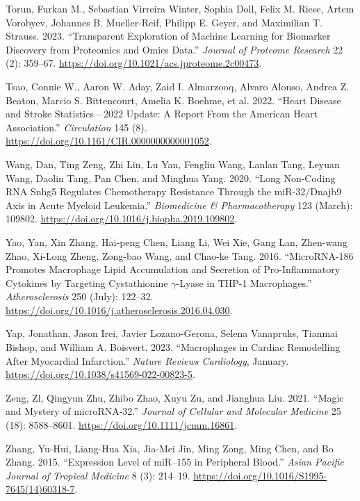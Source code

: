 \documentclass[smallextended]{svjour3}       %
\newlength{\cslhangindent}
\newlength{\cslentryspacingunit} %
\newenvironment{CSLReferences}[2] %
 {%
  \setlength{\parindent}{0pt}
  \ifodd #1
  \let\oldpar\par
  \def\par{\hangindent=\cslhangindent\oldpar}
  \fi
  \setlength{\parskip}{#2\cslentryspacingunit}
 }%
 {}
\begin{document}
\begin{CSLReferences}{1}{0}
\leavevmode{}%
Torun, Furkan M., Sebastian Virreira Winter, Sophia Doll, Felix M.
Riese, Artem Vorobyev, Johannes B. Mueller-Reif, Philipp E. Geyer, and
Maximilian T. Strauss. 2023. {``Transparent {Exploration} of {Machine}
{Learning} for {Biomarker} {Discovery} from {Proteomics} and {Omics}
{Data}.''} \emph{Journal of Proteome Research} 22 (2): 359--67.
\url{https://doi.org/10.1021/acs.jproteome.2c00473}.

\leavevmode{}%
Tsao, Connie W., Aaron W. Aday, Zaid I. Almarzooq, Alvaro Alonso, Andrea
Z. Beaton, Marcio S. Bittencourt, Amelia K. Boehme, et al. 2022.
{``Heart {Disease} and {Stroke} {Statistics}---2022 {Update}: {A}
{Report} {From} the {American} {Heart} {Association}.''}
\emph{Circulation} 145 (8).
\url{https://doi.org/10.1161/CIR.0000000000001052}.

\leavevmode{}%
Wang, Dan, Ting Zeng, Zhi Lin, Lu Yan, Fenglin Wang, Lanlan Tang, Leyuan
Wang, Daolin Tang, Pan Chen, and Minghua Yang. 2020. {``Long Non-Coding
{RNA} {Snhg5} Regulates Chemotherapy Resistance Through the
{miR}-32/{Dnajb9} Axis in Acute Myeloid Leukemia.''} \emph{Biomedicine
\& Pharmacotherapy} 123 (March): 109802.
\url{https://doi.org/10.1016/j.biopha.2019.109802}.

\leavevmode{}%
Yao, Yan, Xin Zhang, Hai-peng Chen, Liang Li, Wei Xie, Gang Lan,
Zhen-wang Zhao, Xi-Long Zheng, Zong-bao Wang, and Chao-ke Tang. 2016.
{``{MicroRNA}-186 Promotes Macrophage Lipid Accumulation and Secretion
of Pro-Inflammatory Cytokines by Targeting Cystathionine
\(\gamma\)-Lyase in {THP}-1 Macrophages.''} \emph{Atherosclerosis} 250
(July): 122--32.
\url{https://doi.org/10.1016/j.atherosclerosis.2016.04.030}.

\leavevmode{}%
Yap, Jonathan, Jason Irei, Javier Lozano-Gerona, Selena Vanapruks,
Tianmai Bishop, and William A. Boisvert. 2023. {``Macrophages in Cardiac
Remodelling After Myocardial Infarction.''} \emph{Nature Reviews
Cardiology}, January. \url{https://doi.org/10.1038/s41569-022-00823-5}.

\leavevmode{}%
Zeng, Zl, Qingyun Zhu, Zhibo Zhao, Xuyu Zu, and Jianghua Liu. 2021.
{``Magic and Mystery of {microRNA}‐32.''} \emph{Journal of Cellular and
Molecular Medicine} 25 (18): 8588--8601.
\url{https://doi.org/10.1111/jcmm.16861}.

\leavevmode{}%
Zhang, Yu-Hui, Liang-Hua Xia, Jia-Mei Jin, Ming Zong, Ming Chen, and Bo
Zhang. 2015. {``Expression Level of {miR}--155 in Peripheral Blood.''}
\emph{Asian Pacific Journal of Tropical Medicine} 8 (3): 214--19.
\url{https://doi.org/10.1016/S1995-7645(14)60318-7}.


\end{CSLReferences}
\end{document}
